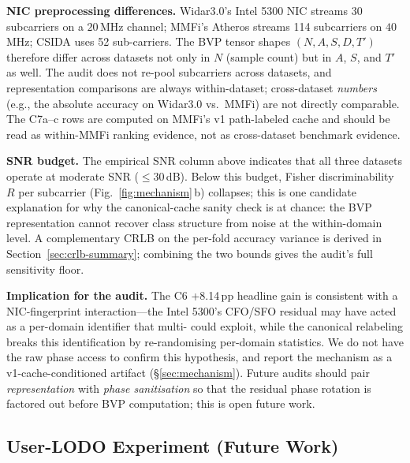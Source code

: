 \documentclass[11pt]{article}
\theoremstyle{definition}
\newcommand{\Rx}{\text{Rx}}
\begin{document}
\textbf{NIC preprocessing differences.} Widar3.0's Intel 5300 NIC streams 30 subcarriers on a $20$\,MHz channel; MMFi's Atheros streams 114 subcarriers on $40$\,MHz; CSIDA uses 52 sub-carriers. The BVP tensor shapes $(N, A, S, D, T')$ therefore differ across datasets not only in $N$ (sample count) but in $A$, $S$, and $T'$ as well. The audit does not re-pool subcarriers across datasets, and representation comparisons are always within-dataset; cross-dataset \emph{numbers} (e.g., the absolute accuracy on Widar3.0 vs.\ MMFi) are not directly comparable. The C7a--c rows are computed on MMFi's v1 path-labeled cache and should be read as within-MMFi ranking evidence, not as cross-dataset benchmark evidence.

\textbf{SNR budget.} The empirical SNR column above indicates that all three datasets operate at moderate SNR ($\le 30$\,dB). Below this budget, Fisher discriminability $R$ per subcarrier (Fig.~\ref{fig:mechanism}\,b) collapses; this is one candidate explanation for why the canonical-cache sanity check is at chance: the BVP representation cannot recover class structure from noise at the within-domain level. A complementary CRLB on the per-fold accuracy variance is derived in Section~\ref{sec:crlb-summary}; combining the two bounds gives the audit's full sensitivity floor.

\medskip
\noindent\textbf{Implication for the audit.} The C6 +8.14\,pp headline gain is consistent with a NIC-fingerprint interaction---the Intel 5300's CFO/SFO residual may have acted as a per-domain identifier that multi-\Rx{} could exploit, while the canonical relabeling breaks this identification by re-randomising per-domain statistics. We do not have the raw phase access to confirm this hypothesis, and report the mechanism as a v1-cache-conditioned artifact (\S\ref{sec:mechanism}). Future audits should pair \emph{representation} with \emph{phase sanitisation} so that the residual phase rotation is factored out before BVP computation; this is open future work.

\subsection{User-LODO Experiment (Future Work)}
\label{sec:user-lodo-future}
\end{document}
